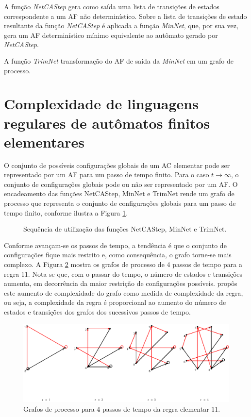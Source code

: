 \documentclass[12pt,a4paper]{article}
\begin{document}
A função \emph{NetCAStep} gera como saída uma lista de transições
de estados correspondente a um AF não determinístico.
Sobre a lista de transições de estado resultante da função
\emph{NetCAStep} é aplicada a função \emph{MinNet}, que, por sua vez,
gera um AF determinístico mínimo equivalente ao autômato gerado por
\emph{NetCAStep}.

A função \emph{TrimNet} transformação do AF de saída da \emph{MinNet}
em um grafo de processo.

\newpage

\section{Complexidade de linguagens regulares de autômatos
finitos elementares}

O conjunto de possíveis configurações globais de um AC elementar pode ser
representado por um AF para um passo de tempo finito. Para
o caso $t \rightarrow \infty$, o conjunto de configurações globais pode ou
não ser representado por um AF. O encadeamento das funções NetCAStep, MinNet
e TrimNet rende um grafo de processo que representa o conjunto de
configurações globais para um passo de tempo finito, conforme ilustra
a Figura \ref{fig:net}.

\begin{figure}[htp]
\begin{center}

\centerline{\box\graph}
\caption{Sequência de utilização das funções NetCAStep, MinNet e TrimNet.}
\label{fig:net}
\end{center}
\end{figure}

Conforme avançam-se os passos de tempo, a tendência é que o conjunto de 
configurações fique mais restrito e, como consequência, o grafo torne-se
mais complexo. A Figura \ref{fig:r11t} mostra os grafos de processo de
4 passos de tempo para a regra 11. Nota-se que, com o passar do tempo,
o número de estados e transições aumenta, em decorrência da maior
restrição de configurações possíveis.  propôs
este aumento de complexidade do grafo como medida de complexidade da
regra, ou seja, a complexidade da regra é proporcional ao aumento do número
de estados e transições dos grafos dos sucessivos passos de tempo.

\begin{figure}[htp]
\begin{center}
\includegraphics[scale=1.0]{img/Rule11.eps}
\caption{Grafos de processo para 4 passos de tempo da regra elementar 11.}
\label{fig:r11t}
\end{center}
\end{figure}
\end{document}

